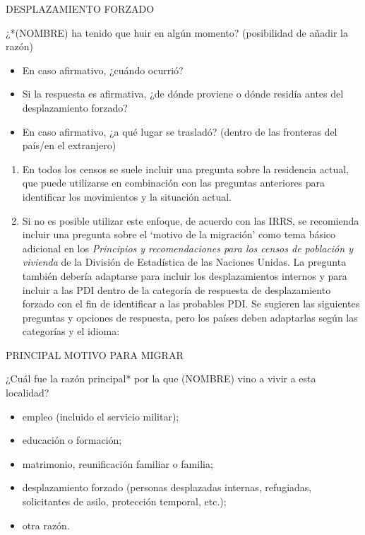 \documentclass[
]{book}
\providecommand{\tightlist}{%
  \setlength{\itemsep}{0pt}\setlength{\parskip}{0pt}}
\begin{document}
DESPLAZAMIENTO FORZADO

¿*(NOMBRE) ha tenido que huir en algún momento? (posibilidad de añadir la razón)

\begin{itemize}
\tightlist
\item
  En caso afirmativo, ¿cuándo ocurrió?
\item
  Si la respuesta es afirmativa, ¿de dónde proviene o dónde residía antes del desplazamiento forzado?
\item
  En caso afirmativo, ¿a qué lugar se trasladó? (dentro de las fronteras del país/en el extranjero)
\end{itemize}

\begin{enumerate}
\def\labelenumi{\arabic{enumi}.}
\tightlist
\item
  En todos los censos se suele incluir una pregunta sobre la residencia actual, que puede utilizarse en combinación con las preguntas anteriores para identificar los movimientos y la situación actual.
\item
  Si no es posible utilizar este enfoque, de acuerdo con las IRRS, se recomienda incluir una pregunta sobre el `motivo de la migración' como tema básico adicional en los \emph{Principios y recomendaciones para los censos de población y vivienda} de la División de Estadística de las Naciones Unidas. La pregunta también debería adaptarse para incluir los desplazamientos internos y para incluir a las PDI dentro de la categoría de respuesta de desplazamiento forzado con el fin de identificar a las probables PDI. Se sugieren las siguientes preguntas y opciones de respuesta, pero los países deben adaptarlas según las categorías y el idioma:
\end{enumerate}

PRINCIPAL MOTIVO PARA MIGRAR

¿Cuál fue la razón principal* por la que (NOMBRE) vino a vivir a esta localidad?

\begin{itemize}
\tightlist
\item
  empleo (incluido el servicio militar);
\item
  educación o formación;
\item
  matrimonio, reunificación familiar o familia;
\item
  desplazamiento forzado (personas desplazadas internas, refugiadas, solicitantes de asilo, protección temporal, etc.);
\item
  otra razón.
\end{itemize}
\end{document}
